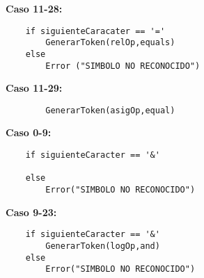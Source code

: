 \documentclass{article}
\begin{document}
\textbf{Caso 11-28:}
\begin{verbatim}
    if siguienteCaracater == '='
        GenerarToken(relOp,equals)
    else 
        Error ("SIMBOLO NO RECONOCIDO")  
\end{verbatim}

\textbf{Caso 11-29:}
\begin{verbatim}
        GenerarToken(asigOp,equal)
\end{verbatim}
\textbf{Caso 0-9:}
\begin{verbatim}
    if siguienteCaracter == '&'
        
    else
        Error("SIMBOLO NO RECONOCIDO")
\end{verbatim}

\textbf{Caso 9-23:}
\begin{verbatim}
    if siguienteCaracter == '&'
        GenerarToken(logOp,and)
    else
        Error("SIMBOLO NO RECONOCIDO")
\end{verbatim}
\end{document}
